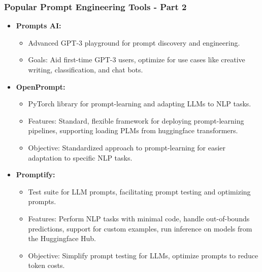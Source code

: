 \begin{frame}[fragile]\frametitle{Popular Prompt Engineering Tools - Part 2}
  \begin{itemize}
    \item \textbf{Prompts AI:}
      \begin{itemize}
        \item Advanced GPT-3 playground for prompt discovery and engineering.
        \item Goals: Aid first-time GPT-3 users, optimize for use cases like creative writing, classification, and chat bots.
      \end{itemize}
    \item \textbf{OpenPrompt:}
      \begin{itemize}
        \item PyTorch library for prompt-learning and adapting LLMs to NLP tasks.
        \item Features: Standard, flexible framework for deploying prompt-learning pipelines, supporting loading PLMs from huggingface transformers.
        \item Objective: Standardized approach to prompt-learning for easier adaptation to specific NLP tasks.
      \end{itemize}
    \item \textbf{Promptify:}
      \begin{itemize}
        \item Test suite for LLM prompts, facilitating prompt testing and optimizing prompts.
        \item Features: Perform NLP tasks with minimal code, handle out-of-bounds predictions, support for custom examples, run inference on models from the Huggingface Hub.
        \item Objective: Simplify prompt testing for LLMs, optimize prompts to reduce token costs.
      \end{itemize}
  \end{itemize}
\end{frame}

